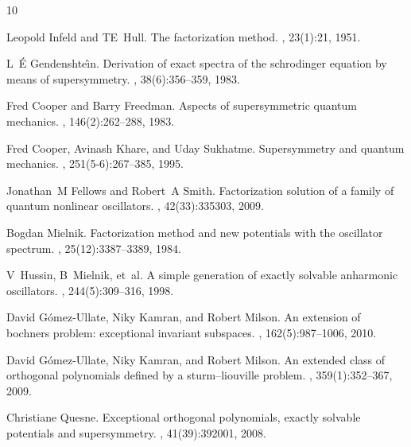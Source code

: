 \documentclass[12pt]{article}
\numberwithin{equation}{section} %
\begin{document}
\begin{thebibliography}{10}

Leopold Infeld and TE~Hull.
\newblock The factorization method.
, 23(1):21, 1951.

L~{\'E} Gendenshte{\^\i}n.
\newblock Derivation of exact spectra of the schrodinger equation by means of
  supersymmetry.
, 38(6):356--359, 1983.

Fred Cooper and Barry Freedman.
\newblock Aspects of supersymmetric quantum mechanics.
, 146(2):262--288, 1983.

Fred Cooper, Avinash Khare, and Uday Sukhatme.
\newblock Supersymmetry and quantum mechanics.
, 251(5-6):267--385, 1995.

Jonathan~M Fellows and Robert~A Smith.
\newblock Factorization solution of a family of quantum nonlinear oscillators.
,
  42(33):335303, 2009.

Bogdan Mielnik.
\newblock Factorization method and new potentials with the oscillator spectrum.
, 25(12):3387--3389, 1984.

V~Hussin, B~Mielnik, et~al.
\newblock A simple generation of exactly solvable anharmonic oscillators.
, 244(5):309--316, 1998.

David G{\'o}mez-Ullate, Niky Kamran, and Robert Milson.
\newblock An extension of bochners problem: exceptional invariant subspaces.
, 162(5):987--1006, 2010.

David G{\'o}mez-Ullate, Niky Kamran, and Robert Milson.
\newblock An extended class of orthogonal polynomials defined by a
  sturm--liouville problem.
,
  359(1):352--367, 2009.

Christiane Quesne.
\newblock Exceptional orthogonal polynomials, exactly solvable potentials and
  supersymmetry.
,
  41(39):392001, 2008.


\end{thebibliography}
\end{document}

